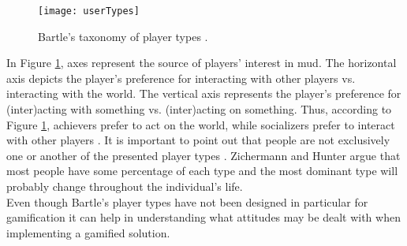 \begin{figure}[h]
    \centering
    \texttt{[image: userTypes]}
    \caption{Bartle's taxonomy of player types \cite{bartle}.}
    \label{fig:userTypes}
\end{figure}
In Figure \ref{fig:userTypes}, axes represent the source of players' interest in  \acrshort{mud}. The horizontal axis depicts the player's preference for interacting with other players vs. interacting with the world. The vertical axis represents the player's preference for (inter)acting with something vs. (inter)acting on something. Thus, according to Figure \ref{fig:userTypes}, achievers prefer to act on the world, while socializers prefer to interact with other players \cite{bartle}. It is important to point out that people are not exclusively one or another of the presented player types \cite{zichermann2011gamification}. Zichermann and Hunter \cite{zichermann2011gamification} argue that most people have some percentage of each type and the most dominant type will probably change throughout the individual's life.\\ Even though Bartle's player types have not been designed in particular for gamification it can help in understanding what attitudes may be dealt with when implementing a gamified solution. 
